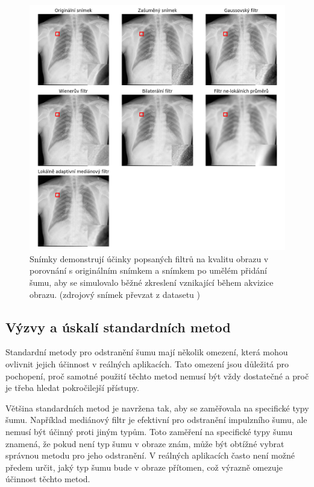 \documentclass[male,czech,api_ing]{thesis}
\begin{document}
\begin{figure}[h]
    \centering
    \includegraphics[width=\linewidth]{Prilohy/Obrazky/NoiseReduction.png}
    \caption{Snímky demonstrují účinky popsaných filtrů na kvalitu obrazu v porovnání s originálním snímkem a snímkem po umělém přidání šumu, aby se simulovalo běžné zkreslení vznikající během akvizice obrazu. (zdrojový snímek převzat z datasetu \cite{LungDataset})}
    \label{fig:noise_reduction_filters}
\end{figure}

\subsection{Výzvy a úskalí standardních metod}
Standardní metody pro odstranění šumu mají několik omezení, která mohou ovlivnit jejich účinnost v reálných aplikacích. Tato omezení jsou důležitá pro pochopení, proč samotné použití těchto metod nemusí být vždy dostatečné a proč je třeba hledat pokročilejší přístupy.

Většina standardních metod je navržena tak, aby se zaměřovala na specifické typy šumu. Například mediánový filtr je efektivní pro odstranění impulzního šumu, ale nemusí být účinný proti jiným typům. Toto zaměření na specifické typy šumu znamená, že pokud není typ šumu v obraze znám, může být obtížné vybrat správnou metodu pro jeho odstranění. V reálných aplikacích často není možné předem určit, jaký typ šumu bude v obraze přítomen, což výrazně omezuje účinnost těchto metod.
\end{document}
